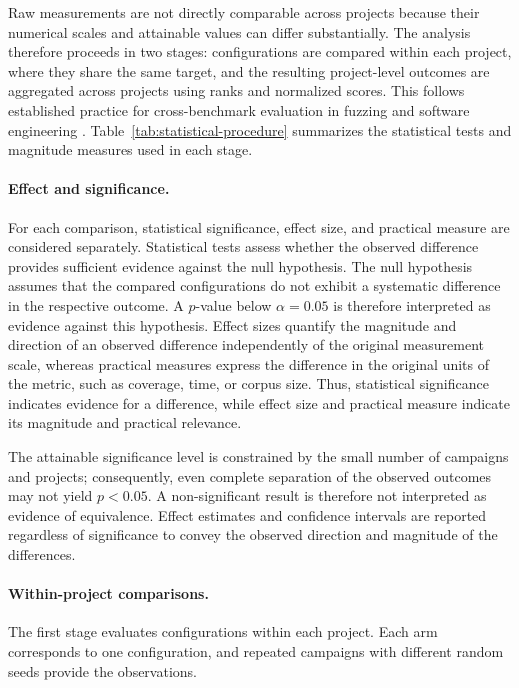 Raw measurements are not directly comparable across projects because their numerical scales and attainable values can differ substantially.
The analysis therefore proceeds in two stages: configurations are compared within each project, where they share the same target, and the resulting project-level outcomes are aggregated across projects using ranks and normalized scores.
This follows established practice for cross-benchmark evaluation in fuzzing and software engineering \cite{demsar2006,metzman2021,klees2018,arcuri2014,schloegelSoKPrudentEvaluation2024}.
Table~\ref{tab:statistical-procedure} summarizes the statistical tests and magnitude measures used in each stage.

\paragraph{Effect and significance.}
For each comparison, statistical significance, effect size, and practical measure are considered separately.
Statistical tests assess whether the observed difference provides sufficient evidence against the null hypothesis.
The null hypothesis assumes that the compared configurations do not exhibit a systematic difference in the respective outcome.
A $p$-value below $\alpha=\num{0.05}$ is therefore interpreted as evidence against this hypothesis.
Effect sizes quantify the magnitude and direction of an observed difference independently of the original measurement scale, whereas practical measures express the difference in the original units of the metric, such as coverage, time, or corpus size.
Thus, statistical significance indicates evidence for a difference, while effect size and practical measure indicate its magnitude and practical relevance.

The attainable significance level is constrained by the small number of campaigns and projects; consequently, even complete separation of the observed outcomes may not yield $p<\num{0.05}$.
A non-significant result is therefore not interpreted as evidence of equivalence.
Effect estimates and confidence intervals are reported regardless of significance to convey the observed direction and magnitude of the differences.

\paragraph{Within-project comparisons.}
The first stage evaluates configurations within each project.
Each arm corresponds to one configuration, and repeated campaigns with different random seeds provide the observations.

